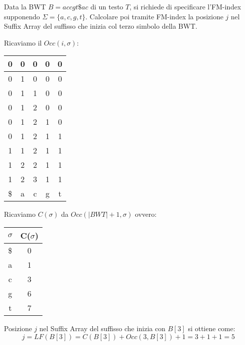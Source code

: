 \begin{esempio}
    Data la BWT $B = accgt\$ac$ di un testo $T$, si richiede di specificare
        l'FM-index supponendo $\Sigma = \{a, c, g, t\}$. Calcolare poi tramite
        FM-index la posizione $j$ nel Suffix Array del suffisso che inizia col
        terzo simbolo della BWT.

        Ricaviamo il $Occ(i, \sigma)$:
        \begin{table}[!ht]
            \centering
            \begin{tabular}{|c|c|c|c|c|}
                \hline
                0  & 0 & 0 & 0 & 0 \\ \hline
                0  & 1 & 0 & 0 & 0 \\ \hline
                0  & 1 & 1 & 0 & 0 \\ \hline
                0  & 1 & 2 & 0 & 0 \\ \hline
                0  & 1 & 2 & 1 & 0 \\ \hline
                0  & 1 & 2 & 1 & 1 \\ \hline
                1  & 1 & 2 & 1 & 1 \\ \hline
                1  & 2 & 2 & 1 & 1 \\ \hline
                1  & 2 & 3 & 1 & 1 \\ \hline
                \$ & a & c & g & t \\ \hline
            \end{tabular}
        \end{table}

        Ricaviamo $C(\sigma)$ da $Occ(|BWT| + 1, \sigma)$ ovvero:
        \begin{table}[!ht]
            \centering
            \begin{tabular}{|c|c|}
                \hline
                $\sigma$ & C($\sigma$) \\ \hline
                \$       & 0           \\ \hline
                a        & 1           \\ \hline
                c        & 3           \\ \hline
                g        & 6           \\ \hline
                t        & 7           \\ \hline
            \end{tabular}
        \end{table}

        Posizione $j$ nel Suffix Array del suffisso che inizia con $B[3]$ si
    ottiene come:
    \begin{equation}
        j = LF(B[3]) = C(B[3]) + Occ(3, B[3]) + 1 = 3 + 1 + 1 = 5
    \end{equation}
\end{esempio}

